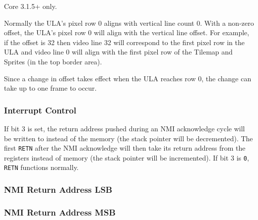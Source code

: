 \begin{NextPort}
\end{NextPort}

Core 3.1.5+ only.

Normally the ULA's pixel row 0 aligns with vertical line count 0. With a non-zero offset, the ULA's pixel row 0 will align with the vertical line offset. For example, if the offset is 32 then video line 32 will correspond to the first pixel row in the ULA and video line 0 will align with the first pixel row of the Tilemap and Sprites (in the top border area).

Since a change in offset takes effect when the ULA reaches row 0, the change can take up to one frame to occur.


\subsubsection{Interrupt Control }

\begin{NextPort}
\end{NextPort}

If bit 3 is set, the return address pushed during an NMI acknowledge cycle will be written to  instead of the memory (the stack pointer will be decremented). The first {\tt RETN} after the NMI acknowledge will then take its return address from the registers instead of memory (the stack pointer will be incremented). If bit 3 is {\tt 0}, {\tt RETN} functions normally.


\subsubsection{NMI Return Address LSB }
\vspace*{-2ex}
\subsubsection{NMI Return Address MSB }

